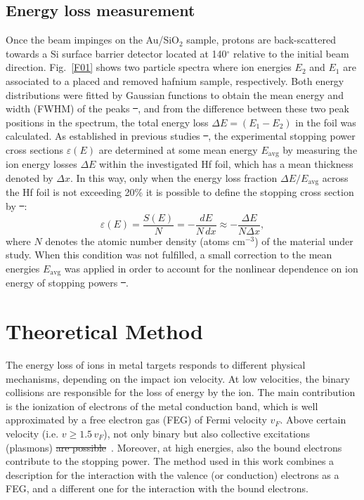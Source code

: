 \documentclass[aps,pra,reprint,groupedaddress,showpacs,showkeys]{revtex4-1} %
\providecommand{\DIFadd}[1]{{\protect\color{blue}\uwave{#1}}} %
\providecommand{\DIFdel}[1]{{\protect\color{red}\sout{#1}}}                      %
\providecommand{\DIFaddbegin}{} %
\providecommand{\DIFaddend}{} %
\providecommand{\DIFdelbegin}{} %
\providecommand{\DIFdelend}{} %
\newcommand{\DIFscaledelfig}{0.5}
\newlength{\DIFdelgraphicswidth} %
\newlength{\DIFdelgraphicsheight} %
\newcommand{\DIFaddincludegraphics}[2][]{{\color{blue}\fbox{\DIFOincludegraphics[#1]{#2}}}} %
\newcommand{\DIFdelincludegraphics}[2][]{%
\sbox{\DIFdelgraphicsbox}{\DIFOincludegraphics[#1]{#2}}%
\settoboxwidth{\DIFdelgraphicswidth}{\DIFdelgraphicsbox} %
\settoboxtotalheight{\DIFdelgraphicsheight}{\DIFdelgraphicsbox} %
\scalebox{\DIFscaledelfig}{%
\parbox[b]{\DIFdelgraphicswidth}{\usebox{\DIFdelgraphicsbox}\\[-\baselineskip] \rule{\DIFdelgraphicswidth}{0em}}\llap{\resizebox{\DIFdelgraphicswidth}{\DIFdelgraphicsheight}{%
\setlength{\unitlength}{\DIFdelgraphicswidth}%
\begin{picture}(1,1)%
\thicklines\linethickness{2pt} %
{\color[rgb]{1,0,0}\put(0,0){\framebox(1,1){}}}%
{\color[rgb]{1,0,0}\put(0,0){\line( 1,1){1}}}%
{\color[rgb]{1,0,0}\put(0,1){\line(1,-1){1}}}%
\end{picture}%
}\hspace*{3pt}}} %
} %
\DeclareRobustCommand{\DIFaddbegin}{\DIFOaddbegin \let\includegraphics\DIFaddincludegraphics} %
\DeclareRobustCommand{\DIFaddend}{\DIFOaddend \let\includegraphics\DIFOincludegraphics} %
\DeclareRobustCommand{\DIFdelbegin}{\DIFOdelbegin \let\includegraphics\DIFdelincludegraphics} %
\DeclareRobustCommand{\DIFdelend}{\DIFOaddend \let\includegraphics\DIFOincludegraphics} %
\begin{document}
\DIFaddend \subsection{Energy loss measurement}
Once the beam impinges on the Au/SiO$_2$ sample, protons are 
back-scattered towards a Si surface barrier detector located at 
140$^{\circ}$ relative to the initial beam direction. Fig.~\ref{F01} 
shows two particle spectra where ion energies $E_2$ and $E_1$ are 
associated to a placed and removed hafnium sample, respectively. Both 
energy distributions were fitted by Gaussian functions to obtain the 
mean energy and width (FWHM) of the peaks \DIFdelbegin \DIFdel{~}\DIFdelend \cite{Sun01}, and from the 
difference between these two peak positions in the spectrum, the total 
energy loss $\Delta E = (E_1 - E_2)$ in the foil was calculated. As 
established in previous studies \DIFdelbegin \DIFdel{~}\DIFdelend \cite{Miranda01,Damache02}, the 
experimental stopping power cross sections $\varepsilon (E) $ are 
determined at some mean energy $E_{\mathrm{avg}}$ by measuring the ion 
energy losses $\Delta E$ within the investigated Hf foil, which has a 
mean thickness denoted by $\Delta x$. In this way, only when the energy 
loss fraction $\Delta E/E_{\mathrm{avg}}$ across the Hf foil is not 
exceeding 20\% it is possible to define the stopping cross section by 
\DIFdelbegin \DIFdel{~}\DIFdelend \cite{Raisanen01,Schulz01}:
\begin{equation}\label{eq:stcross}
 \varepsilon(E)=\frac{S(E)}{N}=-\frac{dE}{N\,dx}\approx-\frac{\Delta E}{N\Delta x},
\end{equation}
where $N$ denotes the atomic number density (atoms cm$^{-3}$) of the 
material under study. When this condition was not fulfilled, a small 
correction to the mean energies $E_{\mathrm{avg}}$ was applied in order 
to account for the nonlinear dependence on ion energy of stopping 
powers \DIFdelbegin \DIFdel{~}\DIFdelend \cite{Chilton,Rajatora}.


\section{Theoretical Method} 
\label{theory}
The energy loss of ions in metal targets responds to different physical 
mechanisms, depending on the impact ion velocity. At low velocities, the 
binary collisions are responsible for the loss of energy by the ion. 
The main contribution is the ionization of electrons of the metal 
conduction band, which is well approximated by a free electron gas (FEG) 
of Fermi velocity $v_F$. Above certain velocity (i.e. $v\geq 1.5\,v_F$), 
not only binary but also collective excitations (plasmons) 
\DIFdelbegin \DIFdel{are possible}\DIFdelend \DIFaddbegin \DIFadd{occur}\DIFaddend ~\cite{mon17}. Moreover, at high energies, also the bound electrons 
contribute to the stopping power. The method used in this work combines 
a description for the interaction with the valence (or conduction) 
electrons as a FEG, and a different one for the interaction with the 
bound electrons.
\end{document}
